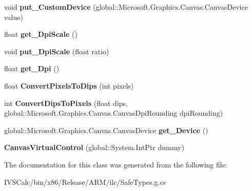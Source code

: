 \begin{DoxyCompactItemize}
\mbox{\label{class_microsoft_1_1_graphics_1_1_canvas_1_1_u_i_1_1_xaml_1_1_canvas_virtual_control_a31200b6eb7450c52a82dd628f921c5e6}} 
void {\bfseries put\+\_\+\+Custom\+Device} (global\+::\+Microsoft.\+Graphics.\+Canvas.\+Canvas\+Device value)
\item 
\mbox{\label{class_microsoft_1_1_graphics_1_1_canvas_1_1_u_i_1_1_xaml_1_1_canvas_virtual_control_a0c92dd8419ce69933e85cefe0b59d3d0}} 
float {\bfseries get\+\_\+\+Dpi\+Scale} ()
\item 
\mbox{\label{class_microsoft_1_1_graphics_1_1_canvas_1_1_u_i_1_1_xaml_1_1_canvas_virtual_control_a87a799ec726f0a3f29547c2594c373e1}} 
void {\bfseries put\+\_\+\+Dpi\+Scale} (float ratio)
\item 
\mbox{\label{class_microsoft_1_1_graphics_1_1_canvas_1_1_u_i_1_1_xaml_1_1_canvas_virtual_control_a904326acb238d05c8b33c83e93d02c97}} 
float {\bfseries get\+\_\+\+Dpi} ()
\item 
\mbox{\label{class_microsoft_1_1_graphics_1_1_canvas_1_1_u_i_1_1_xaml_1_1_canvas_virtual_control_ad9fa8ad680693ecd08e5d86a065f7784}} 
float {\bfseries Convert\+Pixels\+To\+Dips} (int pixels)
\item 
\mbox{\label{class_microsoft_1_1_graphics_1_1_canvas_1_1_u_i_1_1_xaml_1_1_canvas_virtual_control_a03057031bb915e5c65afa64e5dcd1474}} 
int {\bfseries Convert\+Dips\+To\+Pixels} (float dips, global\+::\+Microsoft.\+Graphics.\+Canvas.\+Canvas\+Dpi\+Rounding dpi\+Rounding)
\item 
\mbox{\label{class_microsoft_1_1_graphics_1_1_canvas_1_1_u_i_1_1_xaml_1_1_canvas_virtual_control_a81a72cc0fa39cc066e7b2ebe1c69c058}} 
global\+::\+Microsoft.\+Graphics.\+Canvas.\+Canvas\+Device {\bfseries get\+\_\+\+Device} ()
\item 
\mbox{\label{class_microsoft_1_1_graphics_1_1_canvas_1_1_u_i_1_1_xaml_1_1_canvas_virtual_control_a09dd36cea5da7f54fbb16a91d4df4e72}} 
{\bfseries Canvas\+Virtual\+Control} (global\+::\+System.\+Int\+Ptr dummy)
\end{DoxyCompactItemize}


The documentation for this class was generated from the following file\+:\begin{DoxyCompactItemize}
\item 
I\+V\+S\+Calc/bin/x86/\+Release/\+A\+R\+M/ilc/Safe\+Types.\+g.\+cs\end{DoxyCompactItemize}

